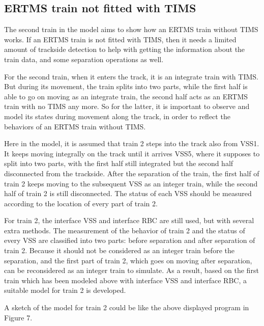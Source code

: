 \documentclass[article,dr=phil,type=msc,colorback,accentcolor=tud9c]{tudthesis}
\begin{document}
  \subsection{ERTMS train not fitted with TIMS}
  
  The second train in the model aims to show how an ERTMS train without TIMS works. If an ERTMS train is not fitted with TIMS, then it needs a limited amount of trackside detection to help with getting the information about the train data, and some separation operations as well.
  
  For the second train, when it enters the track, it is an integrate train with TIMS. But during its movement, the train splits into two parts, while the first half is able to go on moving as an integrate train, the second half acts as an ERTMS train with no TIMS any more. So for the latter, it is important to observe and model its states during movement along the track, in order to reflect the behaviors of an ERTMS train without TIMS.
    
  Here in the model, it is assumed that train 2 steps into the track also from VSS1. It keeps moving integrally on the track until it arrives VSS5, where it supposes to split into two parts, with the first half still integrated but the second half disconnected from the trackside. After the separation of the train, the first half of train 2 keeps moving to the subsequent VSS as an integer train, while the second half of train 2 is still disconnected. The status of each VSS should be measured according to the location of every part of train 2.
  
  For train 2, the interface VSS and interface RBC are still used, but with several extra methods. The measurement of the behavior of train 2 and the status of every VSS are classified into two parts: before separation and after separation of train 2. Because it should not be considered as an integer train before the separation, and the first part of train 2, which goes on moving after separation, can be reconsidered as an integer train to simulate. As a result, based on the first train which has been modeled above with interface VSS and interface RBC, a suitable model for train 2 is developed.
  
  A sketch of the model for train 2 could be like the above displayed program in Figure 7.
  
\end{document}
